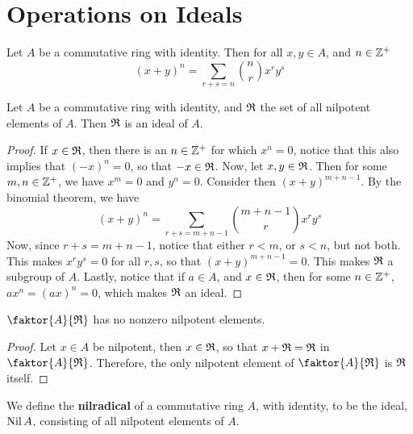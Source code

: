 \section{Operations on Ideals}
\label{section_5.5}

\begin{theorem}\label{5.5.1}
    Let $A$ be a commutative ring with identity. Then for all  $x,y \in A$, and
     $n \in \mathbb{Z}^+$
     \begin{equation*}
         (x+y)^n=\sum_{r+s=n}{{n \choose r}x^ry^s}
     \end{equation*}
\end{theorem}

\begin{lemma}\label{lemma_5.5.2}
    Let $A$ be a commutative ring with identity, and $\mathfrak{R}$ the set of all
    nilpotent elements of $A$. Then $\mathfrak{R}$ is an ideal of $A$.
\end{lemma}
\begin{proof}
    If $x \in \mathfrak{R}$, then there is an  $n \in \mathbb{Z}^+$ for which  $x^n=0$, notice
    that this also implies that  $(-x)^n=0$, so that $-x \in \mathfrak{R}$. Now, let $x,y
    \in \mathfrak{R}$. Then for some $m,n \in \mathbb{Z}^+$, we have $x^m=0$ and $y^n=0$.
    Consider then $(x+y)^{m+n-1}$. By the binomial theorem, we have
     \begin{equation*}
         (x+y)^n=\sum_{r+s=m+n-1}{{m+n-1 \choose r}x^ry^s}
     \end{equation*}
     Now, since $r+s=m+n-1$, notice that either  $r<m$, or  $s<n$, but not both.
     This makes  $x^ry^s=0$ for all  $r,s$, so that  $(x+y)^{m+n-1}=0$. This
     makes $\mathfrak{R}$ a subgroup of  $A$. Lastly, notice that if  $a \in A$, and  $x
     \in \mathfrak{R}$, then for some  $n \in \mathbb{Z}^+$,  $ax^n=(ax)^n=0$, which makes $\mathfrak{R}$
     an ideal.
\end{proof}
\begin{corollary}
    $\faktor{A}{\Rf}$ has no nonzero nilpotent elements.
\end{corollary}
\begin{proof}
    Let $x \in A$ be nilpotent, then $x \in \mathfrak{R}$, so that $x+\mathfrak{R}=\mathfrak{R}$ in
    $\faktor{A}{\Rf}$. Therefore, the only nilpotent element of
    $\faktor{A}{\Rf}$ is $\mathfrak{R}$ itself.
\end{proof}

\begin{definition}
    We define the \textbf{nilradical} of a commutative ring $A$, with identity,
    to be the ideal, $\operatorname{Nil}{A}$, consisting of all nilpotent elements of $A$.
\end{definition}

